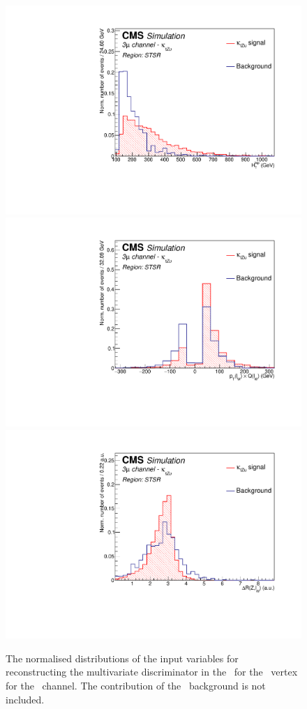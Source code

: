 \begin{figure}[htbp]
				\includegraphics[width=0.3\linewidth]{6_Search/Figures/PlotsTechnics/TotalHt_lepZutsingletopuuu_norm}
			\includegraphics[width=0.3\linewidth]{6_Search/Figures/PlotsTechnics/ptWQZutsingletopuuu_norm}
	\includegraphics[width=0.3\linewidth]{6_Search/Figures/PlotsTechnics/dRZWlepZutsingletopuuu_norm}
	\caption{The normalised distributions of the input variables for reconstructing the multivariate discriminator in the \STSR\ for the \Zut\ vertex for the \mumumu\ channel. The contribution of the \NPL\ background is not included. }
	\label{fig:singletopZutnormalized}
\end{figure}
